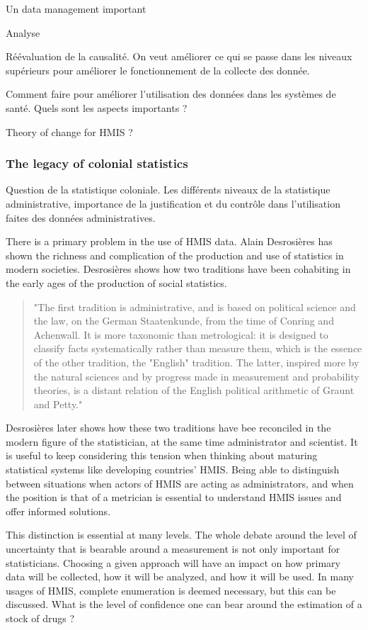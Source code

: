 \documentclass[a4paper,11pt,final,twoside]{article}
\begin{document}
Un data management important

Analyse

Réévaluation de la causalité. On veut améliorer ce qui se passe dans les niveaux supérieurs  pour améliorer le fonctionnement de la collecte des donnée. 

Comment faire pour améliorer l'utilisation des données dans les systèmes de santé. Quels sont les aspects importants ?

Theory of change for HMIS ?

\subsubsection{The legacy of colonial statistics}

Question de la statistique coloniale. Les différents niveaux de la statistique administrative, importance de la justification et du contrôle dans l'utilisation faites des données administratives.

There is a primary problem in the use of HMIS data. Alain Desrosières has shown the richness and complication of the production and use of statistics in modern societies. Desrosières shows how two traditions have been cohabiting in the early ages of the production of social statistics\cite{admin_savant}. 

\begin{quote}
"The first tradition is administrative, and is based on political science and the law, on the German Staatenkunde, from the time of Conring and Achenwall. It is more taxonomic than metrological: it is designed to classify facts systematically rather than measure them, which is the essence of the other tradition, the "English" tradition. The latter, inspired more by the natural sciences and by progress made in measurement and probability theories, is a distant relation of the English political arithmetic of Graunt and Petty."
\end{quote}

Desrosières later shows how these two traditions have bee reconciled in the modern figure of the statistician, at the same time administrator and scientist. It is useful to keep considering this tension when thinking about maturing statistical systems like developing countries' HMIS. Being able to distinguish between situations when actors of HMIS are acting as administrators, and when the position is that of a metrician is essential to understand HMIS issues and offer informed solutions. 

This distinction is essential at many levels. The whole debate around the level of uncertainty that is bearable around a measurement is not only important for statisticians. Choosing a given approach will have an impact on how primary data will be collected, how it will be analyzed, and how it will be used. In many usages of HMIS, complete enumeration is deemed necessary, but this can be discussed. What is the level of confidence one can bear around the estimation of a stock of drugs ?
\end{document}
